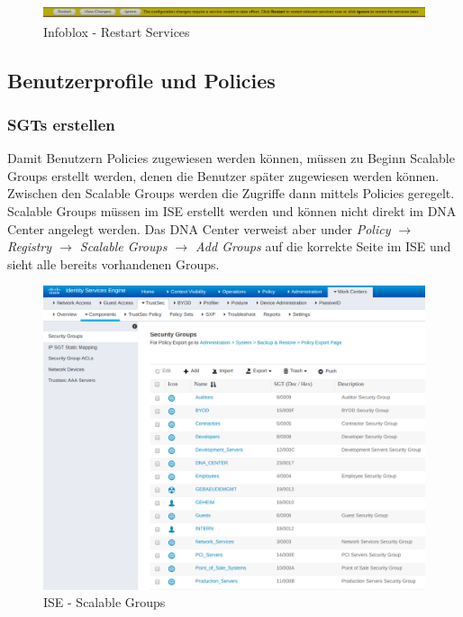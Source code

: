 \begin{figure}[H]
	\centering
	\includegraphics[height=0.4cm]{img/secondtry/infoblox-restart-services.png}
	\caption{Infoblox - Restart Services}
	\label{fig:infoblox-restart-services}
\end{figure}

\subsection{Benutzerprofile und Policies}

\subsubsection{SGTs erstellen}

Damit Benutzern Policies zugewiesen werden können, müssen zu Beginn Scalable Groups erstellt werden, denen die Benutzer später zugewiesen werden können. Zwischen den Scalable Groups werden die Zugriffe dann mittels Policies geregelt.
Scalable Groups müssen im ISE erstellt werden und können nicht direkt im DNA Center angelegt werden. Das DNA Center verweist aber under  \textit{Policy $\rightarrow$ Registry $\rightarrow$ Scalable Groups $\rightarrow$ Add Groups} auf die korrekte Seite im ISE und sieht alle bereits vorhandenen Groups. 

\begin{figure}[H]
	\centering
	\includegraphics[width=12cm]{img/secondtry/ise-scalable-groups.png}
	\caption{ISE - Scalable Groups}
	\label{fig:ise-scalable-groups}
\end{figure}

